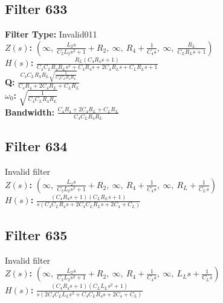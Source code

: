 \documentclass{article}
\begin{document}
\subsection*{Filter 633}
\textbf{Filter Type:} Invalid011 \\ 
\textbf{$Z(s)$:} $\left( \infty, \  \frac{L_{2} s}{C_{2} L_{2} s^{2} + 1} + R_{2}, \  \infty, \  R_{4} + \frac{1}{C_{4} s}, \  \infty, \  \frac{R_{L}}{C_{L} R_{L} s + 1}\right)$ \\ 
\textbf{$H(s)$:} $\frac{R_{L} \left(C_{4} R_{4} s + 1\right)}{C_{4} C_{L} R_{4} R_{L} s^{2} + C_{4} R_{4} s + 2 C_{4} R_{L} s + C_{L} R_{L} s + 1}$ \\ 
\textbf{Q:} $\frac{C_{4} C_{L} R_{4} R_{L} \sqrt{\frac{1}{C_{4} C_{L} R_{4} R_{L}}}}{C_{4} R_{4} + 2 C_{4} R_{L} + C_{L} R_{L}}$ \\ 
\textbf{$\omega_0$:} $\sqrt{\frac{1}{C_{4} C_{L} R_{4} R_{L}}}$ \\ 
\textbf{Bandwidth:} $\frac{C_{4} R_{4} + 2 C_{4} R_{L} + C_{L} R_{L}}{C_{4} C_{L} R_{4} R_{L}}$ \\ 
\subsection*{Filter 634}
Invalid filter \\ 
\textbf{$Z(s)$:} $\left( \infty, \  \frac{L_{2} s}{C_{2} L_{2} s^{2} + 1} + R_{2}, \  \infty, \  R_{4} + \frac{1}{C_{4} s}, \  \infty, \  R_{L} + \frac{1}{C_{L} s}\right)$ \\ 
\textbf{$H(s)$:} $\frac{\left(C_{4} R_{4} s + 1\right) \left(C_{L} R_{L} s + 1\right)}{s \left(C_{4} C_{L} R_{4} s + 2 C_{4} C_{L} R_{L} s + 2 C_{4} + C_{L}\right)}$ \\ 
\subsection*{Filter 635}
Invalid filter \\ 
\textbf{$Z(s)$:} $\left( \infty, \  \frac{L_{2} s}{C_{2} L_{2} s^{2} + 1} + R_{2}, \  \infty, \  R_{4} + \frac{1}{C_{4} s}, \  \infty, \  L_{L} s + \frac{1}{C_{L} s}\right)$ \\ 
\textbf{$H(s)$:} $\frac{\left(C_{4} R_{4} s + 1\right) \left(C_{L} L_{L} s^{2} + 1\right)}{s \left(2 C_{4} C_{L} L_{L} s^{2} + C_{4} C_{L} R_{4} s + 2 C_{4} + C_{L}\right)}$ \\ 
\end{document}
